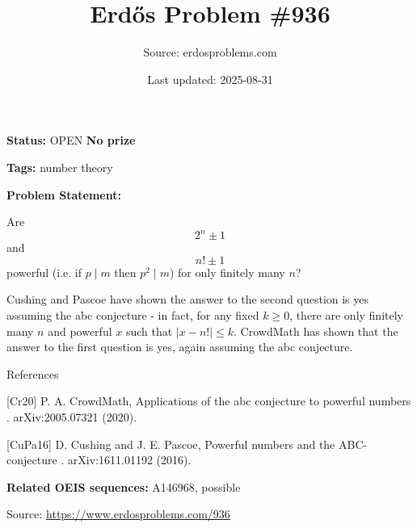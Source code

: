 \documentclass{article}
\title{Erd\H{o}s Problem \#936}
\date{Last updated: 2025-08-31}
\author{Source: erdosproblems.com}
\begin{document}
\maketitle

\noindent\textbf{Status:} OPEN \quad \textbf{No prize}

\noindent\textbf{Tags:} number theory

\medskip

\noindent\textbf{Problem Statement:}

Are\[2^n\pm 1\]and\[n!\pm 1\]powerful (i.e. if $p\mid m$ then $p^2\mid m$) for only finitely many $n$?




Cushing and Pascoe \cite{CuPa16} have shown the answer to the second question is yes assuming the abc conjecture - in fact, for any fixed $k\geq 0$, there are only finitely many $n$ and powerful $x$ such that $\lvert x-n!\rvert \leq k$. CrowdMath \cite{Cr20} has shown that the answer to the first question is yes, again assuming the abc conjecture.




References

[Cr20] P. A. CrowdMath, Applications of the abc conjecture to powerful numbers . arXiv:2005.07321 (2020).

[CuPa16] D. Cushing and J. E. Pascoe, Powerful numbers and the ABC-conjecture . arXiv:1611.01192 (2016).

\noindent\textbf{Related OEIS sequences:} A146968, possible


\bigskip
\noindent\small{Source: \url{https://www.erdosproblems.com/936}}
\end{document}
